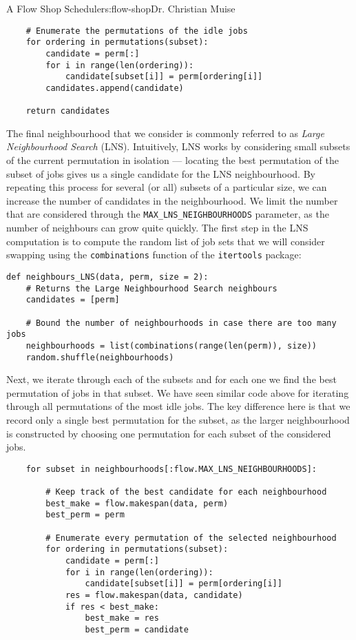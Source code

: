 \begin{aosachapter}{A Flow Shop Scheduler}{s:flow-shop}{Dr. Christian Muise}
\begin{verbatim}
    # Enumerate the permutations of the idle jobs
    for ordering in permutations(subset):
        candidate = perm[:]
        for i in range(len(ordering)):
            candidate[subset[i]] = perm[ordering[i]]
        candidates.append(candidate)

    return candidates
\end{verbatim}

The final neighbourhood that we consider is commonly referred to as
\emph{Large Neighbourhood Search} (LNS). Intuitively, LNS works by
considering small subsets of the current permutation in isolation ---
locating the best permutation of the subset of jobs gives us a single
candidate for the LNS neighbourhood. By repeating this process for
several (or all) subsets of a particular size, we can increase the
number of candidates in the neighbourhood. We limit the number that are
considered through the \texttt{MAX\_LNS\_NEIGHBOURHOODS} parameter, as
the number of neighbours can grow quite quickly. The first step in the
LNS computation is to compute the random list of job sets that we will
consider swapping using the \texttt{combinations} function of the
\texttt{itertools} package:

\begin{verbatim}
def neighbours_LNS(data, perm, size = 2):
    # Returns the Large Neighbourhood Search neighbours
    candidates = [perm]

    # Bound the number of neighbourhoods in case there are too many jobs
    neighbourhoods = list(combinations(range(len(perm)), size))
    random.shuffle(neighbourhoods)
\end{verbatim}

Next, we iterate through each of the subsets and for each one we find
the best permutation of jobs in that subset. We have seen similar code
above for iterating through all permutations of the most idle jobs. The
key difference here is that we record only a single best permutation for
the subset, as the larger neighbourhood is constructed by choosing one
permutation for each subset of the considered jobs.

\begin{verbatim}
    for subset in neighbourhoods[:flow.MAX_LNS_NEIGHBOURHOODS]:

        # Keep track of the best candidate for each neighbourhood
        best_make = flow.makespan(data, perm)
        best_perm = perm

        # Enumerate every permutation of the selected neighbourhood
        for ordering in permutations(subset):
            candidate = perm[:]
            for i in range(len(ordering)):
                candidate[subset[i]] = perm[ordering[i]]
            res = flow.makespan(data, candidate)
            if res < best_make:
                best_make = res
                best_perm = candidate


\end{verbatim}
\end{aosachapter}
